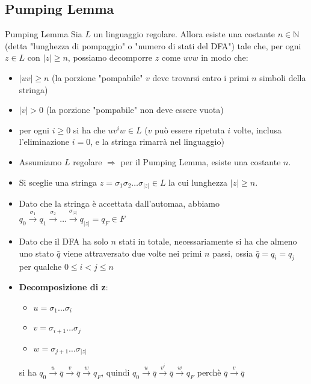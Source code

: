 \documentclass[12pt, a4paper]{report}
\begin{document}
            \subsection{Pumping Lemma}
                \begin{theorembox}{Pumping Lemma}{}
                    Sia $L$ un linguaggio regolare. Allora esiste una costante $n\in\mathbb{N}$ (detta "lunghezza di pompaggio" o "numero di stati del DFA") tale che, per ogni $z\in L$ con $|z|\geq n$, possiamo decomporre $z$ come $uvw$ in modo che: \begin{itemize}
                        \item $|uv|\geq n$ (la porzione "pompabile" $v$ deve trovarsi entro i primi $n$ simboli della stringa)
                        \item $|v|>0$ (la porzione "pompabile" non deve essere vuota)
                        \item per ogni $i\geq 0$ si ha che $uv^iw\in L$ ($v$ può essere ripetuta $i$ volte, inclusa l'eliminazione $i=0$, e la stringa rimarrà nel linguaggio)
                    \end{itemize}
                \end{theorembox}
                \begin{demonstration}
                    \begin{itemize}
                        \item Assumiamo $L$ regolare $\Rightarrow$ per il Pumping Lemma, esiste una costante $n$.
                        \item Si sceglie una stringa $z=\sigma_1\sigma_2\ldots\sigma_{|z|}\in L$ la cui lunghezza $|z|\geq n$.
                        \item Dato che la stringa è accettata dall'automaa, abbiamo $q_0\xrightarrow{\sigma_1}q_1\xrightarrow{\sigma_2}\ldots\xrightarrow{\sigma_{|z|}}q_{|z|}=q_F\in F$
                        \item Dato che il DFA ha solo $n$ stati in totale, necessariamente si ha che almeno uno stato $\bar{q}$ viene attraversato due volte nei primi $n$ passi, ossia $\bar{q}=q_i=q_j$ per qualche $0\leq i<j\leq n$
                        \item \textbf{Decomposizione di z}: \begin{itemize}
                            \item $u=\sigma_1\ldots\sigma_i$
                            \item $v=\sigma_{i+1}\ldots\sigma_j$
                            \item $w=\sigma_{j+1}\ldots\sigma_{|z|}$
                        \end{itemize}
                        si ha $q_0\xrightarrow{u}\bar{q}\xrightarrow{v}\bar{q}\xrightarrow{w}q_F$, quindi $q_0\xrightarrow{u}\bar{q}\xrightarrow{v^i}\bar{q}\xrightarrow{w}q_F$ perchè $\bar{q}\xrightarrow{v}\bar{q}$
                    \end{itemize}
                \end{demonstration}
\end{document}

